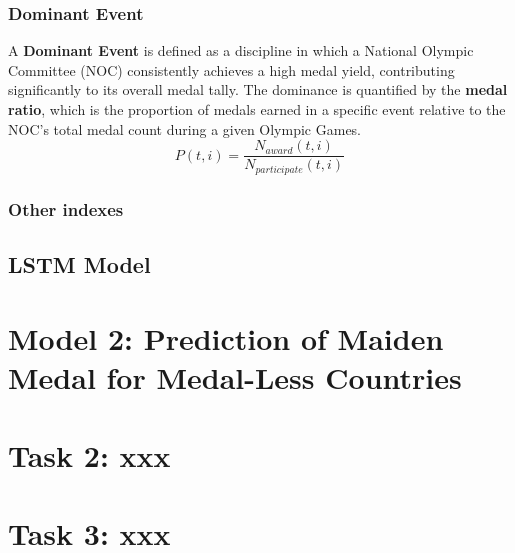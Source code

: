 \documentclass{mcmthesis}
\begin{document}
\subsubsection{Dominant Event}

A \textbf{Dominant Event} is defined as a discipline in which a National Olympic Committee (NOC) consistently achieves a high medal yield, contributing significantly to its overall medal tally. The dominance is quantified by the \textbf{medal ratio}, which is the proportion of medals earned in a specific event relative to the NOC's total medal count during a given Olympic Games.
\begin{equation*}
P(t,i)=\frac{ N_{award}(t,i) }{ N_{participate}(t,i) }
\end{equation*}






\subsubsection{Other indexes}




\subsection{LSTM Model}







\section{Model 2: Prediction of Maiden Medal for Medal-Less Countries}























\section{Task 2: xxx}

\section{Task 3: xxx}
\end{document}
